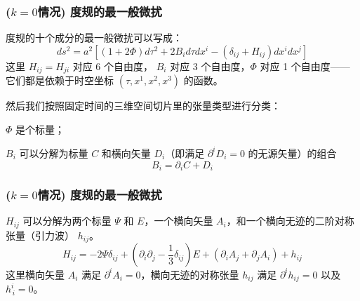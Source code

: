\documentclass[CJK,13pt]{beamer}
\begin{document}
   \begin{frame}
      \frametitle{($k=0$情况) 度规的最一般微扰}
      度规的十个成分的最一般微扰可以写成：
      $$ ds^2 = a^2\left[(1+2\Phi)d\tau^2+ 2B_id\tau dx^i - \left(\delta_{ij}+H_{ij}\right)dx^i dx^j\right]$$
      这里 $H_{ij}=H_{ji}$ 对应 6 个自由度， $B_i$ 对应 3 个自由度，$\Phi$ 对应 1 个自由度——它们都是依赖于时空坐标 $(\tau, x^1,x^2,x^3)$ 的函数。

      \skipline

      然后我们{\blue 按照固定时间的三维空间切片里的张量类型}进行分类：
      \bitem
      \item{$\Phi$ 是个标量；}

        \item{$B_i$ 可以分解为标量 $C$ 和横向矢量 $D_i$（即满足 $\partial^iD_i=0$ 的无源矢量）的组合
          $$ B_i = \partial_i C +  D_i$$}
          \eitem

      
  \end{frame}

   \begin{frame}
      \frametitle{($k=0$情况) 度规的最一般微扰}
      \bitem
    \item{$H_{ij}$ 可以分解为两个标量 $\Psi$ 和 $E$，一个横向矢量 $A_i$，和一个横向无迹的二阶对称张量（引力波） $h_{ij}$。
      $$ H_{ij} = -2\Psi \delta_{ij} + \left(\partial_i\partial_j - \frac{1}{3}\delta_{ij}\right)E + (\partial_iA_j + \partial_j A_i) + h_{ij}$$
      这里横向矢量  $A_i$ 满足 $\partial^iA_i=0$，横向无迹的对称张量 $h_{ij}$ 满足 $\partial^ih_{ij} = 0$ 以及 $h^i_{\, i} = 0$。


      \skiplines


    }
      \eitem
  \end{frame}
   
\end{document}
